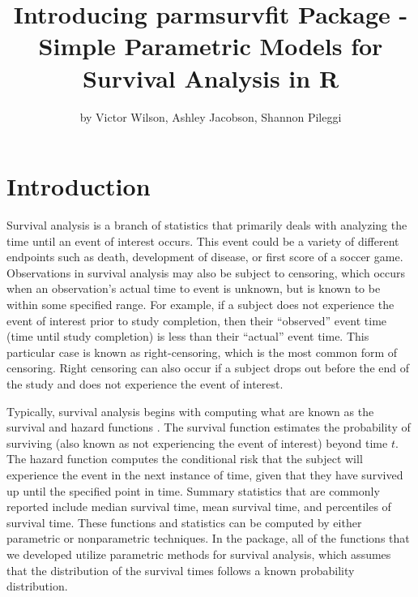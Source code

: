 \title{Introducing parmsurvfit Package - Simple Parametric Models for Survival
Analysis in R}
\author{by Victor Wilson, Ashley Jacobson, Shannon Pileggi}

\maketitle



\hypertarget{introduction}{%
\section{Introduction}\label{introduction}}

Survival analysis is a branch of statistics that primarily deals with
analyzing the time until an event of interest occurs. This event could
be a variety of different endpoints such as death, development of
disease, or first score of a soccer game. Observations in survival
analysis may also be subject to censoring, which occurs when an
observation's actual time to event is unknown, but is known to be within
some specified range. For example, if a subject does not experience the
event of interest prior to study completion, then their ``observed''
event time (time until study completion) is less than their ``actual''
event time. This particular case is known as right-censoring, which is
the most common form of censoring. Right censoring can also occur if a
subject drops out before the end of the study and does not experience
the event of interest.

Typically, survival analysis begins with computing what are known as the
survival and hazard functions \citep{Kleinbaum2012}. The survival
function estimates the probability of surviving (also known as not
experiencing the event of interest) beyond time \(t\). The hazard
function computes the conditional risk that the subject will experience
the event in the next instance of time, given that they have survived up
until the specified point in time. Summary statistics that are commonly
reported include median survival time, mean survival time, and
percentiles of survival time. These functions and statistics can be
computed by either parametric or nonparametric techniques. In the
 package, all of the functions that we developed
utilize parametric methods for survival analysis, which assumes that the
distribution of the survival times follows a known probability
distribution.

